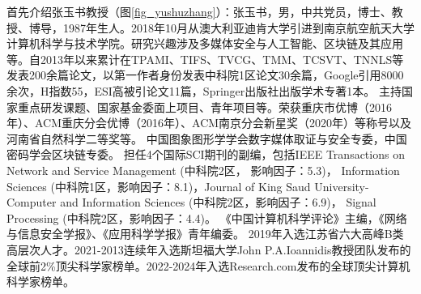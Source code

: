 \documentclass[a4paper]{nuist}
\begin{document}
首先介绍张玉书教授（图\ref{fig_yushuzhang}）：张玉书，男，中共党员，博士、教授、博导，1987年生人。2018年10月从澳大利亚迪肯大学引进到南京航空航天大学计算机科学与技术学院。研究兴趣涉及多媒体安全与人工智能、区块链及其应用等。自2013年以来累计在TPAMI、TIFS、TVCG、TMM、TCSVT、TNNLS等发表200余篇论文，以第一作者身份发表中科院1区论文30余篇，Google引用8000余次，H指数55，ESI高被引论文11篇，Springer出版社出版学术专著1本。 主持国家重点研发课题、国家基金委面上项目、青年项目等。荣获重庆市优博（2016年）、ACM重庆分会优博（2016年）、ACM南京分会新星奖（2020年）等称号以及河南省自然科学二等奖等。 中国图象图形学学会数字媒体取证与安全专委，中国密码学会区块链专委。 担任4个国际SCI期刊的副编，包括IEEE Transactions on Network and Service Management (中科院2区， 影响因子：5.3)， Information Sciences (中科院1区，影响因子：8.1)，Journal of King Saud University-Computer and Information Sciences (中科院2区，影响因子：6.9)， Signal Processing (中科院2区，影响因子：4.4)。 《中国计算机科学评论》主编，《网络与信息安全学报》、《应用科学学报》青年编委。 2019年入选江苏省六大高峰B类高层次人才。2021-2013连续年入选斯坦福大学John P.A.Ioannidis教授团队发布的全球前2\%顶尖科学家榜单。2022-2024年入选Research.com发布的全球顶尖计算机科学家榜单\cite{NUAA:online}。
\end{document}
